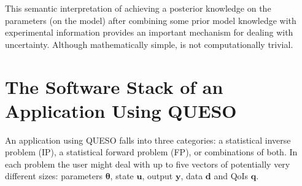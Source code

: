 This semantic interpretation of achieving a posterior knowledge on the parameters (on the model)
after combining some prior model knowledge with experimental information provides an important mechanism for dealing with uncertainty.
Although mathematically simple, is not computationally trivial. 


\section{The Software Stack of an Application Using QUESO}



An application using QUESO falls into three categories: a statistical inverse problem (IP), a statistical forward problem (FP), or combinations of both.
In each problem the user might deal with up to five vectors of potentially very different sizes:
parameters $\boldsymbol{\theta}$, state $\mathbf{u}$, output $\mathbf{y}$, data $\mathbf{d}$ and QoIs $\mathbf{q}$.

